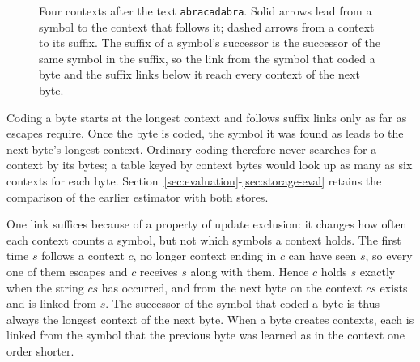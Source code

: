 \documentclass[10pt,letterpaper]{article}
\begin{document}
\begin{figure}[htbp]
\centering
{}
\caption{Four contexts after the text \texttt{abracadabra}. Solid arrows lead from a symbol to the context that follows it; dashed arrows from a context to its suffix. The suffix of a symbol's successor is the successor of the same symbol in the suffix, so the link from the symbol that coded a byte and the suffix links below it reach every context of the next byte.}\label{fig:trie}
\end{figure}

Coding a byte starts at the longest context and follows suffix links only as far as escapes require. Once the byte is coded, the symbol it was found as leads to the next byte's longest context. Ordinary coding therefore never searches for a context by its bytes; a table keyed by context bytes would look up as many as six contexts for each byte. Section~\ref{sec:evaluation}-\ref{sec:storage-eval} retains the comparison of the earlier estimator with both stores.

One link suffices because of a property of update exclusion: it changes how often each context counts a symbol, but not which symbols a context holds. The first time $s$ follows a context $c$, no longer context ending in $c$ can have seen $s$, so every one of them escapes and $c$ receives $s$ along with them. Hence $c$ holds $s$ exactly when the string $cs$ has occurred, and from the next byte on the context $cs$ exists and is linked from $s$. The successor of the symbol that coded a byte is thus always the longest context of the next byte. When a byte creates contexts, each is linked from the symbol that the previous byte was learned as in the context one order shorter.
\end{document}
